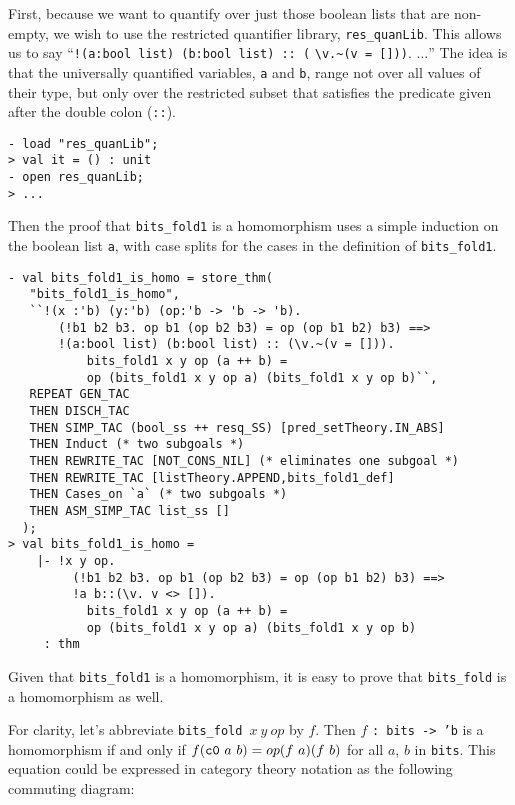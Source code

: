 First, because we want to quantify over just those boolean lists that
are non-empty, we wish to use the restricted quantifier library,
\texttt{res\_quanLib}. This allows us to say
``\texttt{!(a:bool list) (b:bool list)~::~(}
\verb|\|\texttt{v.}\verb|~|\texttt{(v = []))}. $\ldots$''
The idea is that the universally quantified variables, \texttt{a}
and \texttt{b}, range not over all values of their type, but only over
the restricted subset that satisfies
the predicate given after the double colon (\texttt{::}).
%
\begin{session}
\begin{verbatim}
- load "res_quanLib";
> val it = () : unit
- open res_quanLib;
> ...
\end{verbatim}
\end{session}

Then the proof that \texttt{bits\_fold1} is a homomorphism
uses a simple induction on the boolean list \texttt{a}, with
case splits for the cases
in the definition of \texttt{bits\_fold1}.
%
\begin{session}
\begin{verbatim}
- val bits_fold1_is_homo = store_thm(
   "bits_fold1_is_homo",
   ``!(x :'b) (y:'b) (op:'b -> 'b -> 'b).
       (!b1 b2 b3. op b1 (op b2 b3) = op (op b1 b2) b3) ==>
       !(a:bool list) (b:bool list) :: (\v.~(v = [])).
           bits_fold1 x y op (a ++ b) =
           op (bits_fold1 x y op a) (bits_fold1 x y op b)``,
   REPEAT GEN_TAC
   THEN DISCH_TAC
   THEN SIMP_TAC (bool_ss ++ resq_SS) [pred_setTheory.IN_ABS]
   THEN Induct (* two subgoals *)
   THEN REWRITE_TAC [NOT_CONS_NIL] (* eliminates one subgoal *)
   THEN REWRITE_TAC [listTheory.APPEND,bits_fold1_def]
   THEN Cases_on `a` (* two subgoals *)
   THEN ASM_SIMP_TAC list_ss []
  );
> val bits_fold1_is_homo =
    |- !x y op.
         (!b1 b2 b3. op b1 (op b2 b3) = op (op b1 b2) b3) ==>
         !a b::(\v. v <> []).
           bits_fold1 x y op (a ++ b) =
           op (bits_fold1 x y op a) (bits_fold1 x y op b)
     : thm
\end{verbatim}
\end{session}

Given that \texttt{bits\_fold1} is a homomorphism, it is easy to prove that
\texttt{bits\_fold} is a homomorphism as well.

For clarity, let's abbreviate \texttt{bits\_fold}~$x\ y\ op$ by $f$.
Then $f$ \texttt{{:}~bits~->~'b} is a homomorphism if and only if
$f(\mbox{\tt c0}\ a\ b) = op (f\ a) (f\ b)$ for all $a$, $b$ in \texttt{bits}.
This equation
could be expressed in category theory notation as the following
commuting diagram:

